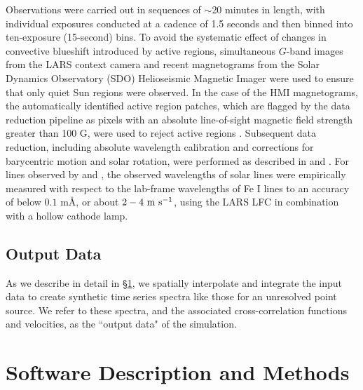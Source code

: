 \documentclass[twocolumn]{aastex63}
\newcommand{\ms}{{\rm m\ s}^{-1}}
\newcommand{\revise}[1]{#1}
\begin{document}
Observations were carried out in \revise{sequences of} $\sim$20 minutes in length, with individual exposures conducted at a cadence of 1.5 seconds and then binned into ten-exposure (15-second) bins. To avoid \revise{the systematic effect of changes in convective blueshift} introduced by active regions, simultaneous $G$-band images from the LARS context camera and recent magnetograms from the Solar Dynamics Observatory (SDO) Helioseismic Magnetic Imager \citep[HMI,][]{Pesnell2012, Scherrer2012} were used to ensure that only quiet Sun regions were observed. \revise{In the case of the HMI magnetograms, the automatically identified active region patches, which are flagged by the data reduction pipeline as pixels with an absolute line-of-sight magnetic field strength greater than 100 G, were used to reject active regions \citep{Hoeksema2014}.} Subsequent data reduction, including absolute wavelength calibration and corrections for barycentric motion and solar rotation, were performed as described in \citet{Lohner-Bottcher2017} and . For lines observed by  and , the \revise{observed} wavelengths of solar lines were empirically measured \revise{with respect to the lab-frame wavelengths of Fe \textsc{I} lines to an accuracy of below $0.1$ m\AA, or about $2-4\ \ms$,} using the \revise{LARS LFC in combination with a} hollow cathode lamp. \par

\subsection{Output Data} \label{subsec:output_data}
As we describe in detail in \S \ref{methods}, we spatially interpolate and integrate the input data to create synthetic time series spectra like those for an unresolved point source. We refer to these spectra, and the associated cross-correlation functions and velocities, as the ``output data" of the simulation. \par

\section{Software Description and Methods} \label{methods}
\end{document}
